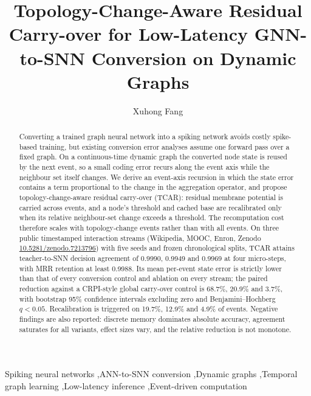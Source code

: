 \documentclass[preprint,12pt]{elsarticle}
\begin{document}
\begin{frontmatter}

\title{Topology-Change-Aware Residual Carry-over for Low-Latency GNN-to-SNN Conversion on Dynamic Graphs}

\author{Xuhong Fang}
\address{Dongguan City College, Dongguan, Guangdong, China}

\begin{abstract}
Converting a trained graph neural network into a spiking network avoids costly spike-based training, but existing conversion error analyses assume one forward pass over a fixed graph. On a continuous-time dynamic graph the converted node state is reused by the next event, so a small coding error recurs along the event axis while the neighbour set itself changes. We derive an event-axis recursion in which the state error contains a term proportional to the change in the aggregation operator, and propose topology-change-aware residual carry-over (TCAR): residual membrane potential is carried across events, and a node's threshold and cached base are recalibrated only when its relative neighbour-set change exceeds a threshold. The recomputation cost therefore scales with topology-change events rather than with all events. On three public timestamped interaction streams (Wikipedia, MOOC, Enron, Zenodo \url{10.5281/zenodo.7213796}) with five seeds and frozen chronological splits, TCAR attains teacher-to-SNN decision agreement of 0.9990, 0.9949 and 0.9969 at four micro-steps, with MRR retention at least 0.9988. Its mean per-event state error is strictly lower than that of every conversion control and ablation on every stream; the paired reduction against a CRPI-style global carry-over control is 68.7\%, 20.9\% and 3.7\%, with bootstrap 95\% confidence intervals excluding zero and Benjamini--Hochberg $q<0.05$. Recalibration is triggered on 19.7\%, 12.9\% and 4.9\% of events. Negative findings are also reported: discrete memory dominates absolute accuracy, agreement saturates for all variants, effect sizes vary, and the relative reduction is not monotone.
\end{abstract}

\begin{keyword}
Spiking neural networks \sep ANN-to-SNN conversion \sep Dynamic graphs \sep Temporal graph learning \sep Low-latency inference \sep Event-driven computation
\end{keyword}

\end{frontmatter}
\end{document}
